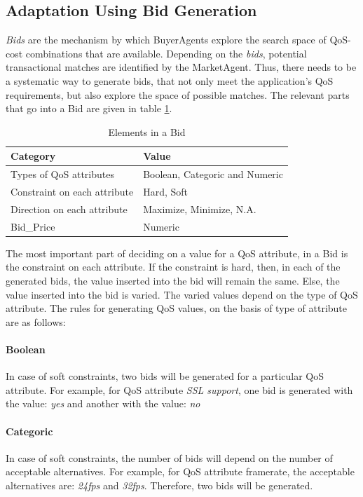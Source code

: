 \documentclass[10pt,journal,compsoc]{IEEEtran}
\begin{document}
\subsection{Adaptation Using Bid Generation}\label{bid_generation}

\textit{Bids} are the mechanism by which BuyerAgents explore the search space of QoS-cost combinations that are available. Depending on the \textit{bids}, potential transactional matches are identified by the MarketAgent. Thus, there needs to be a systematic way to generate bids, that not only meet the application's QoS requirements, but also explore the space of possible matches. The relevant parts that go into a Bid are given in table \ref{tbl:bid_elements}.

\begin{table}
\centering
\begin{tabular}{p{7cm}p{7cm}}
\toprule
Category & Value \\
\midrule
Types of QoS attributes & Boolean, Categoric  and Numeric \\
Constraint on each attribute & Hard, Soft \\ 
Direction on each attribute & Maximize, Minimize, N.A. \\ 
Bid\_Price & Numeric \\
\bottomrule
\end{tabular}
\caption{Elements in a Bid \label{tbl:bid_elements}}
\end{table}

The most important part of deciding on a value for a QoS attribute, in a Bid is the constraint on each attribute. If the constraint is hard, then, in each of the generated bids, the value inserted into the bid will remain the same. Else, the value inserted into the bid is varied. The varied values depend on the type of QoS attribute. The rules for generating QoS values, on the basis of type of attribute are as follows:

\paragraph{Boolean} In case of soft constraints, two bids will be generated for a particular QoS attribute. For example, for QoS attribute \textit{SSL support}, one bid is generated with the value: \textit{yes} and another with the value: \textit{no}

\paragraph{Categoric} In case of soft constraints, the number of bids will depend on the number of acceptable alternatives. For example, for QoS attribute {framerate}, the acceptable alternatives are: \textit{24fps} and \textit{32fps}. Therefore, two bids will be generated. 
\end{document}

